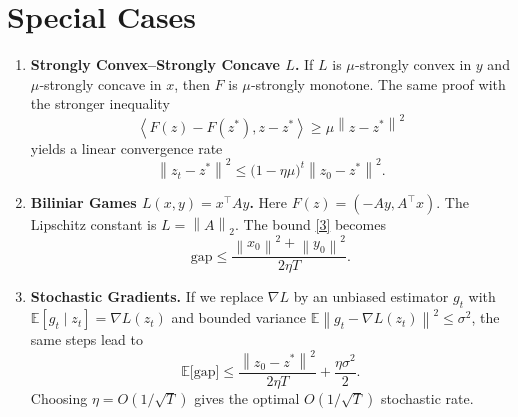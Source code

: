 \documentclass{article}
\newcommand{\norm}[1]{\left\|#1\right\|}
\newcommand{\inner}[2]{\left\langle #1,#2 \right\rangle}
\begin{document}
\section*{Special Cases}
\begin{enumerate}
\item \textbf{Strongly Convex–Strongly Concave $L$.}  
If $L$ is $\mu$‑strongly convex in $y$ and $\mu$‑strongly concave in $x$, then $F$ is $\mu$‑strongly monotone. The same proof with the stronger inequality
\[
\inner{F(z)-F(z^{*})}{z-z^{*}}\ge \mu\norm{z-z^{*}}^{2}
\]
yields a linear convergence rate
\[
\norm{z_{t}-z^{*}}^{2}\le\bigl(1-\eta\mu\bigr)^{t}\norm{z_{0}-z^{*}}^{2}.
\]

\item \textbf{Biliniar Games $L(x,y)=x^{\top}Ay$.}  
Here $F(z)=( -Ay, A^{\top}x)$. The Lipschitz constant is $L=\norm{A}_{2}$. The bound \eqref{3} becomes
\[
\text{gap}\le\frac{\norm{x_{0}}^{2}+\norm{y_{0}}^{2}}{2\eta T}.
\]

\item \textbf{Stochastic Gradients.}  
If we replace $\nabla L$ by an unbiased estimator $g_{t}$ with $\mathbb{E}[g_{t}\mid z_{t}]=\nabla L(z_{t})$ and bounded variance $\mathbb{E}\norm{g_{t}-\nabla L(z_{t})}^{2}\le\sigma^{2}$, the same steps lead to
\[
\mathbb{E}\bigl[\text{gap}\bigr]\le
\frac{\norm{z_{0}-z^{*}}^{2}}{2\eta T}+\frac{\eta\sigma^{2}}{2}.
\]
Choosing $\eta=O(1/\sqrt{T})$ gives the optimal $O(1/\sqrt{T})$ stochastic rate.
\end{enumerate}
\end{document}

